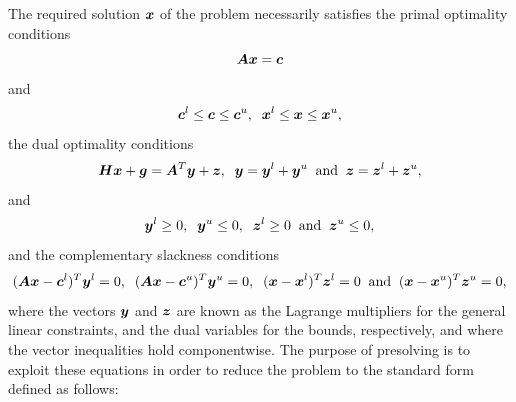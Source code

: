 \documentclass{galahad}
\begin{document}

\galmethod
The required solution ${\bm{x}}$ of the problem necessarily satisfies
the primal optimality conditions
\[
{\bm{A}} {\bm{x}} = {\bm{c}}
\]
and
\[
{\bm{c}}^{l} \leq {\bm{c}} \leq {\bm{c}}^{u}, \;\;
{\bm{x}}^{l} \leq {\bm{x}} \leq {\bm{x}}^{u},
\]
the dual optimality conditions
\[
 {\bm{H}} {\bm{x}} + {\bm{g}} =  {\bm{A}}^{T} {\bm{y}} + {\bm{z}}, \;\;
 {\bm{y}} = {\bm{y}}^{l} + {\bm{y}}^{u} \;\; \mbox{and} \;\;
 {\bm{z}} = {\bm{z}}^{l} + {\bm{z}}^{u},
\]
and
\[
 {\bm{y}}^{l} \geq 0 , \;\;
 {\bm{y}}^{u} \leq 0 , \;\;
 {\bm{z}}^{l} \geq 0 \;\; \mbox{and} \;\;
 {\bm{z}}^{u} \leq 0 ,
\]
and the complementary slackness conditions
\[
( {\bm{A}} {\bm{x}} - {\bm{c}}^{l} )^{T} {\bm{y}}^{l} = 0,  \;\;
( {\bm{A}} {\bm{x}} - {\bm{c}}^{u} )^{T} {\bm{y}}^{u} = 0,  \;\;
({\bm{x}} -{\bm{x}}^{l} )^{T} {\bm{z}}^{l} = 0   \;\; \mbox{and} \;\;
({\bm{x}} -{\bm{x}}^{u} )^{T} {\bm{z}}^{u} = 0,
\]
where the vectors ${\bm{y}}$ and ${\bm{z}}$ are known as the Lagrange multipliers for
the general linear constraints, and the dual variables for the bounds,
respectively, and where the vector inequalities hold componentwise.
The purpose of presolving is to exploit these equations in order to reduce the
problem to the standard form defined as follows:
\end{document}
